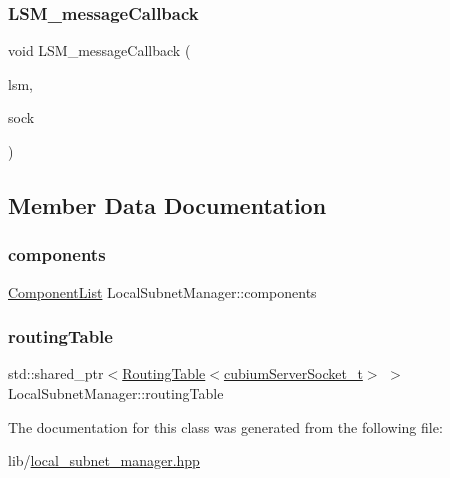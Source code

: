 \subsubsection{\texorpdfstring{L\+S\+M\+\_\+message\+Callback}{LSM\_messageCallback}}
{\footnotesize\ttfamily void L\+S\+M\+\_\+message\+Callback (\begin{DoxyParamCaption}\item[{std\+::shared\+\_\+ptr$<$ \hyperlink{classLocalSubnetManager}{Local\+Subnet\+Manager} $>$}]{lsm,  }\item[{\hyperlink{structcubiumServerSocket__t}{cubium\+Server\+Socket\+\_\+t} $\ast$}]{sock }\end{DoxyParamCaption})\hspace{0.3cm}{\ttfamily [friend]}}



\subsection{Member Data Documentation}
\mbox{\label{classLocalSubnetManager_abc353dea714fbebbcd5dd37fab411299}} 
\subsubsection{\texorpdfstring{components}{components}}
{\footnotesize\ttfamily \hyperlink{classComponentList}{Component\+List} Local\+Subnet\+Manager\+::components\hspace{0.3cm}{\ttfamily [private]}}

\mbox{\label{classLocalSubnetManager_afbdea942383e01998f54098eb157d89c}} 
\subsubsection{\texorpdfstring{routing\+Table}{routingTable}}
{\footnotesize\ttfamily std\+::shared\+\_\+ptr$<$\hyperlink{classRoutingTable}{Routing\+Table}$<$\hyperlink{structcubiumServerSocket__t}{cubium\+Server\+Socket\+\_\+t}$>$ $>$ Local\+Subnet\+Manager\+::routing\+Table\hspace{0.3cm}{\ttfamily [private]}}



The documentation for this class was generated from the following file\+:\begin{DoxyCompactItemize}
\item 
lib/\hyperlink{local__subnet__manager_8hpp}{local\+\_\+subnet\+\_\+manager.\+hpp}\end{DoxyCompactItemize}
